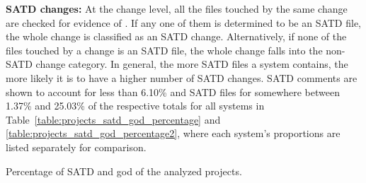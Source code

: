 \noindent\textbf{SATD changes:}
At the change level, all the files touched by the same change are checked for evidence of \SATD. If any one of them is determined to be an SATD file, the whole change is classified as an SATD change. Alternatively, if none of the files touched by a change is an SATD file, the whole change falls into the non-SATD change category. In general, the more SATD files a system contains, the more likely it is to have a higher number of SATD changes. SATD comments are shown to account for less than 6.10\% and SATD files for somewhere between 1.37\% and 25.03\% of the respective totals for all systems in Table~\ref{table:projects_satd_god_percentage} and \ref{table:projects_satd_god_percentage2}, where each system's proportions are listed separately for comparison.

\begin{landscape}
	
	
	\begin{table}[htbp]
		\small
		\centering
		\caption{Percentage of SATD and god of the analyzed projects.}
		\begin{adjustbox}{width=1.0\textwidth}
			

\end{adjustbox}
\end{table}
\end{landscape}
